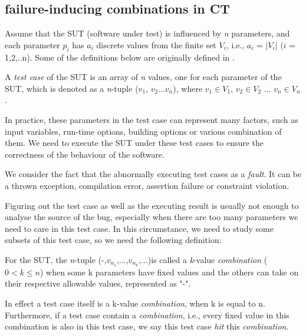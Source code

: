 \documentclass{sig-alternate}
\begin{document}
\subsection{failure-inducing combinations in CT}

Assume that the SUT (software under test) is influenced by \emph{n} parameters, and each parameter $p_{i}$ has $a_{i}$ discrete values from the finite set $V_{i}$, i.e., $a_{i}$ = $|V_{i}|$ ($i$ = 1,2,..n). Some of the definitions below are originally defined in \cite{nie2011survey}.

\begin{definition}
A \emph{test case} of the SUT is an array of \emph{n} values, one for each parameter of the SUT, which is denoted as a \emph{n}-tuple ($v_{1}$, $v_{2}$...$v_{n}$), where $v_{1}\in V_{1}$, $v_{2} \in V_{2}$ ... $v_{n} \in V_{n}$.
\end{definition}

In practice, these parameters in the test case can represent many factors, such as input variables, run-time options, building options or various combination of them. We need to execute the SUT under these test cases to ensure the correctness of the behaviour of the software.

We consider the fact that the abnormally executing test cases as a \emph{fault}. It can be a thrown exception, compilation error, assertion failure or constraint violation.

Figuring out the test case as well as the executing result is usually not enough to analyse the source of the bug, especially when there are too many parameters we need to care in this test case. In this circumstance, we need to study some subsets of this test case, so we need the following definition:

\begin{definition}
For the SUT, the \emph{n}-tuple (-,$v_{n_{1}}$,...,$v_{n_{k}}$,...)is called a \emph{k}-value \emph{combination} ($0 < k \leq n $) when some k parameters have fixed values and the others can take on their respective allowable values, represented as "-".

In effect a test case itself is a k-value \emph{combination}, when k is equal to n. Furthermore, if a test case contain a \emph{combination}, i.e., every fixed value in this combination is also in this test case, we say this test case \emph{hit} this \emph{combination}.
\end{definition}
\end{document}
